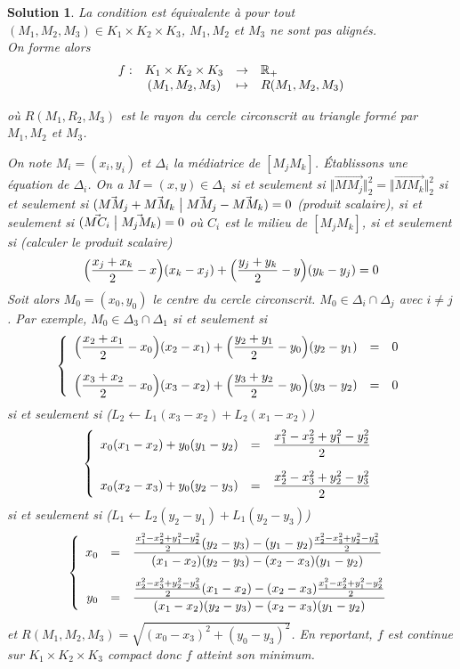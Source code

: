 \documentclass[12pt]{article}
\newtheorem{solution}{Solution}[section]
\theoremstyle{remark}
\newcommand{\function}[5]{
	$$
	\begin{array}{rccl}
		#1: & #2 & \to & #3 \\
		& #4 & \mapsto & #5
	\end{array}
	$$
}
\begin{document}
\begin{solution}
	La condition est équivalente à pour tout $(M_{1},M_{2},M_{3})\in K_{1}\times K_{2}\times K_{3}$, $M_{1},M_{2}$ et $M_{3}$ ne sont pas alignés.\\
	On forme alors \function{f}{K_1\times K_2\times K_3}{\R_+}{(M_1,M_2,M_3)}{R(M_1,M_2,M_3)}
	où $R(M_{1},R_{2},M_{3})$ est le rayon du cercle circonscrit au triangle formé par $M_{1},M_{2}$ et $M_{3}$.

	On note $M_{i}=(x_{i},y_{i})$ et $\Delta_{i}$ la médiatrice de $[M_{j}M_{k}]$. Établissons une équation de $\Delta_{i}$. On a $M=(x,y)\in\Delta_{i}$ si et seulement si $\Vert \vec{MM_{j}}\Vert_{2}^{2}=\Vert\vec{MM_{k}}\Vert_{2}^{2}$ si et seulement si $(\vec{MM_{j}}+\vec{MM_{k}}\bigm|\vec{MM_{j}}-\vec{MM_{k}})=0$ (produit scalaire), si et seulement si $(\vec{MC_{i}}\bigm|\vec{M_{j}M_{k}})=0$ où $C_{i}$ est le milieu de $[M_{j}M_{k}]$, si et seulement si (calculer le produit scalaire)
	$$\Bigl(\frac{x_{j}+x_{k}}{2}-x\Bigr)(x_{k}-x_{j})+\Bigl(\frac{y_{j}+y_{k}}{2}-y\Bigr)(y_{k}-y_{j})=0$$
	Soit alors $M_{0}=(x_{0},y_{0})$ le centre du cercle circonscrit. $M_{0}\in\Delta_{i}\cap\Delta_{j}$ avec $i\neq j$. Par exemple, $M_{0}\in\Delta_{3}\cap\Delta_{1}$ si et seulement si
	$$
	\left\{
		\begin{array}[]{rcl}
			\Bigl(\dfrac{x_{2}+x_{1}}{2}-x_{0}\Bigr)(x_{2}-x_{1})+\Bigl(\dfrac{y_{2}+y_{1}}{2}-y_{0}\Bigr)(y_{2}-y_{1}) &= &0\\[0.5cm]
			\Bigl(\dfrac{x_{3}+x_{2}}{2}-x_{0}\Bigr)(x_{3}-x_{2})+\Bigl(\dfrac{y_{3}+y_{2}}{2}-y_{0}\Bigr)(y_{3}-y_{2}) &= &0
		\end{array}	
	\right.
	$$
	si et seulement si ($L_{2}\leftarrow L_{1}(x_{3}-x_{2})+L_{2}(x_{1}-x_{2})$)
	$$
	\left\{
		\begin{array}[]{rcl}
			x_{0}(x_{1}-x_{2})+y_{0}(y_{1}-y_{2})&=&\dfrac{x_{1}^{2}-x_{2}^{2}+y_{1}^{2}-y_{2}^{2}}{2}\\[0.5cm]
			x_{0}(x_{2}-x_{3})+y_{0}(y_{2}-y_{3})&=&\dfrac{x_{2}^{2}-x_{3}^{2}+y_{2}^{2}-y_{3}^{2}}{2}
		\end{array}	
	\right.
	$$
	si et seulement si ($L_{1}\leftarrow L_{2}(y_{2}-y_{1})+L_{1}(y_{2}-y_{3})$)
	$$
	\left\{
		\begin{array}[]{rcl}
			x_{0} &= & \dfrac{\frac{x_{1}^{2}-x_{2}^{2}+y_{1}^{2}-y_{2}^{2}}{2}(y_{2}-y_{3})-(y_{1}-y_{2})\frac{x_{2}^{2}-x_{3}^{2}+y_{2}^{2}-y_{3}^{2}}{2}}{(x_{1}-x_{2})(y_{2}-y_{3})-(x_{2}-x_{3})(y_{1}-y_{2})}\\[0.5cm]
			y_{0} &= & \dfrac{\frac{x_{2}^{2}-x_{3}^{2}+y_{2}^{2}-y_{3}^{2}}{2}(x_{1}-x_{2})-(x_{2}-x_{3})\frac{x_{1}^{2}-x_{2}^{2}+y_{1}^{2}-y_{2}^{2}}{2}}{(x_{1}-x_{2})(y_{2}-y_{3})-(x_{2}-x_{3})(y_{1}-y_{2})}
		\end{array}	
	\right.
	$$
	et $R(M_{1},M_{2},M_{3})=\sqrt{(x_{0}-x_{3})^{2}+(y_{0}-y_{3})^{2}}$. En reportant, $f$ est continue sur $K_{1}\times K_{2}\times K_{3}$ compact donc $f$ atteint son minimum.
\end{solution}
\end{document}
